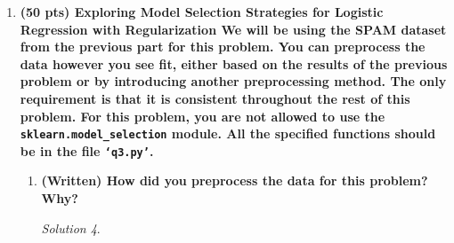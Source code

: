 \documentclass[a4paper,12pt]{article}
\theoremstyle{definition}
\theoremstyle{remark}
\newtheorem*{solution}{Solution}
\begin{document}
\begin{enumerate}
\begin{enumerate}
\begin{solution}
				
			\end{solution}
			\item {\bf(Written) Plot the receiver operating characteristic (ROC) curves for the test data. You should generate 3 plots:}
			\begin{solution}
			
			\end{solution}
			\item {\bf (Written) Given your results in 2c, 2e, and 2f, discuss how the preprocessing affects the models (Logistic and Naive Bayes) with regards to ROC, AUC, and accuracy. Also, comment on how Naive Bayes performance compares with logistic regression}
			\begin{solution}
				
				
			\end{solution}
		\end{enumerate}
		\item {\bf (50 pts) Exploring Model Selection Strategies for Logistic Regression with Regularization
			We will be using the SPAM dataset from the previous part for this problem. You can preprocess the data
			however you see fit, either based on the results of the previous problem or by introducing another
			preprocessing method. The only requirement is that it is consistent throughout the rest of this problem.
			For this problem, you are not allowed to use the \texttt{sklearn.model\_selection} module. All the specified functions should be in the file \texttt{‘q3.py’}.}
	
		\begin{enumerate}
			\item {\bf (Written) How did you preprocess the data for this problem? Why?}
			\begin{solution}
				

\end{solution}
\end{enumerate}
\end{enumerate}
\end{document}
